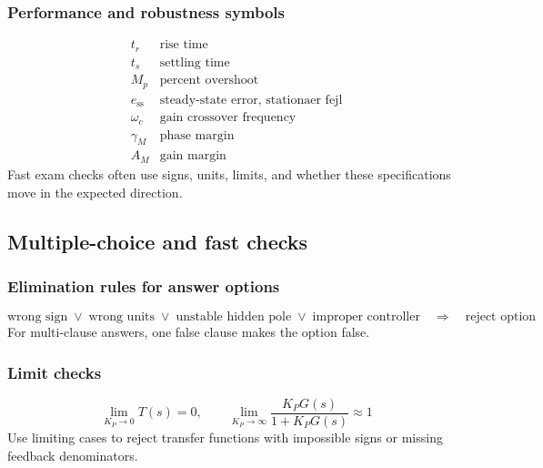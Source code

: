 \subsubsection{Performance and robustness symbols}
\[
\begin{array}{c|l}
t_r & \text{rise time}\\
t_s & \text{settling time}\\
M_p & \text{percent overshoot}\\
e_{\mathrm{ss}} & \text{steady-state error, stationaer fejl}\\
\omega_c & \text{gain crossover frequency}\\
\gamma_M & \text{phase margin}\\
A_M & \text{gain margin}
\end{array}
\]
Fast exam checks often use signs, units, limits, and whether these specifications move in the expected direction.

\subsection{Multiple-choice and fast checks}

\subsubsection{Elimination rules for answer options}
\[
\text{wrong sign} \;\vee\; \text{wrong units} \;\vee\; \text{unstable hidden pole} \;\vee\; \text{improper controller}
\quad\Longrightarrow\quad \text{reject option}
\]
For multi-clause answers, one false clause makes the option false.

\subsubsection{Limit checks}
\[
\lim_{K_P\to 0}T(s)=0,\qquad \lim_{K_P\to\infty}\frac{K_PG(s)}{1+K_PG(s)}\approx 1
\]
Use limiting cases to reject transfer functions with impossible signs or missing feedback denominators.
